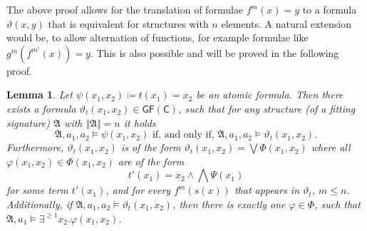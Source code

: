 \documentclass[a4paper,11pt,DIV=15]{scrartcl} %
\renewcommand{\phi}{\varphi}
\theoremstyle{plain}
\newtheorem{lemma}[theorem]{Lemma}
\theoremstyle{definition}
\newcommand{\GFC}{\mathsf{GF}(\mathsf{C})}
\renewcommand{\theta}{\vartheta}
\begin{document}
The above proof allows for the translation of formulae $f^m(x)=y$ to a formula $\theta(x,y)$ that is equivalent for structures with $n$ elements.
A natural extension would be, to allow alternation of functions, for example formulae like $g^m(f^{m'}(x))=y$.
This is also possible and will be proved in the following proof.

\begin{lemma}
	Let $\psi(x_1,x_2)\coloneqq t(x_1)=x_2$ be an atomic formula. 
	Then there exists a formula $\theta_{t}(x_1,x_2)\in\GFC$, such that for any structure (of a fitting signature) $\mathfrak A$ with $\Vert \mathfrak A \Vert = n$ it holds
	$$\mathfrak A,a_1,a_2 \models \psi(x_1,x_2) \text{ if, and only if, } \mathfrak A,a_1,a_2 \models \vartheta_{t}(x_1,x_2).$$ 
	Furthermore, $\theta_{t}(x_1,x_2)$ is of the form $\theta_{t}(x_1,x_2)=\bigvee \Phi(x_1,x_2)$ where all $\phi(x_1,x_2)\in\Phi(x_1,x_2)$ are of the form
	$$t'(x_1)=x_2 \land \bigwedge \Psi(x_1)$$ 
	for some term $t'(x_1)$, and for every $f^m(s(x))$ that appears in $\theta_{t}$, $m\leq n$.
	Additionally, if $\mathfrak A,a_1,a_2\models \theta_{t}(x_1,x_2)$, then there is exactly one $\phi\in\Phi$, such that $\mathfrak A,a_1\models \exists^{\geq 1}x_2.\phi(x_1,x_2)$.
	\label{TranslationOfArbTerms}
\end{lemma}
\end{document}
